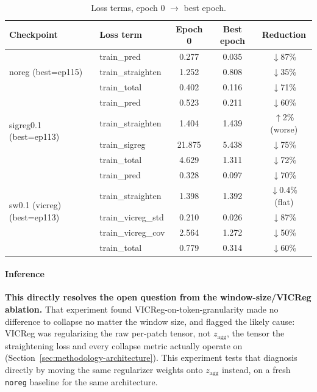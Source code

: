 \begin{table}[H]
\centering
\caption{Loss terms, epoch 0 $\to$ best epoch.}
\label{tab:regularizer-comparison-losses}
\footnotesize
\begin{tabular}{llccc}
\toprule
Checkpoint & Loss term & Epoch 0 & Best epoch & Reduction \\
\midrule
\multirow{3}{*}{noreg (best=ep115)}
 & train\_pred & 0.277 & 0.035 & $\downarrow$87\% \\
 & train\_straighten & 1.252 & 0.808 & $\downarrow$35\% \\
 & train\_total & 0.402 & 0.116 & $\downarrow$71\% \\
\midrule
\multirow{4}{*}{sigreg0.1 (best=ep113)}
 & train\_pred & 0.523 & 0.211 & $\downarrow$60\% \\
 & train\_straighten & 1.404 & 1.439 & $\uparrow$2\% (worse) \\
 & train\_sigreg & 21.875 & 5.438 & $\downarrow$75\% \\
 & train\_total & 4.629 & 1.311 & $\downarrow$72\% \\
\midrule
\multirow{5}{*}{sw0.1 (vicreg) (best=ep113)}
 & train\_pred & 0.328 & 0.097 & $\downarrow$70\% \\
 & train\_straighten & 1.398 & 1.392 & $\downarrow$0.4\% (flat) \\
 & train\_vicreg\_std & 0.210 & 0.026 & $\downarrow$87\% \\
 & train\_vicreg\_cov & 2.564 & 1.272 & $\downarrow$50\% \\
 & train\_total & 0.779 & 0.314 & $\downarrow$60\% \\
\bottomrule
\end{tabular}
\end{table}

\paragraph{Inference}

\textbf{This directly resolves the open question from the window-size/VICReg ablation.}
That experiment found VICReg-on-token-granularity made no difference to collapse no
matter the window size, and flagged the likely cause: VICReg was regularizing the raw
per-patch tensor, not $z_{\mathrm{agg}}$, the tensor the straightening loss and every
collapse metric actually operate on (Section~\ref{sec:methodology-architecture}). This
experiment tests that diagnosis directly by moving the same regularizer weights onto
$z_{\mathrm{agg}}$ instead, on a fresh \texttt{noreg} baseline for the same architecture.

